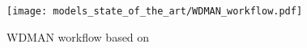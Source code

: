 \begin{figure}[H]
  \centering
  \texttt{[image: models\_state\_of\_the\_art/WDMAN\_workflow.pdf]}
  \caption{WDMAN workflow based on \cite{Zhang2019}}
  \label{fig:WDMAN_workflow}
\end{figure}
 
 
\begin{comment}
\subsection{Domain Conditioned Adaptation Network}
Most domain adaption approaches reduce the domain discrepancy in task-specific layers but use a shared feature extractor backbone across all domains. Li et al \cite{li2020} assume that, if the domain discrepancy is tremendously large, these methods can only reduce the domain discrepancy, but not fundamentally eliminate it. In the proposed Domain Conditioned Adaptation Network (DCAN) Li et al present some alternative and more effectively domain adaptive approach. Li et al recommend to extract domain-specific and -independent features in the feature extractor backbone. Since the source and target domains are correlated to some extend, the network itself can extract domain-independent features. The powerful feature extractor learned from the source domain can also increase the model performance on the target domain. At the same time, features which are too sensitive to the source domain can even reduce the model performance on the target domain. To counteract that phenomena, Li et al recommend to additionally extract domain-specific features in the convolutional layers. This can improve the cross-domain feature alignment in the task-specific layers. A domain conditioned feature correction module is applied to reduce the domain discrepancy in the extracted domain-specific and -independent features. Additionally, the model is optimized with a conventional supervised source and a newly proposed unsupervised target CE-loss defined as following:

\begin{equation}
    \min_{G} L_{s} = -\frac{1}{n_{t}} \sum_{j=1}^{n_{t}} \sum_{k=1}^{C_{n}} G^{(k)}(\pmb{x}_{tj})logG^{(k)}(\pmb{x}_{tj}),
\end{equation}
where $G(\cdot)$ is the learned predictive model, $n_{t}$ the number of source domain samples, $C_{n}$ the classes present in source and target domain and $\pmb{x}_{t}$ the target samples. The presented model is developed for computer vision applications and is never been evaluated in the context of PHM. Since PHM suffers from similar problems, this approach might be relevant and interesting for the PHM community. The model is visualized in fig. \ref{fig:DCAN_model}. In the following, the two domain adaption modules are described in more detail \cite{li2020}. 



\end{comment}
